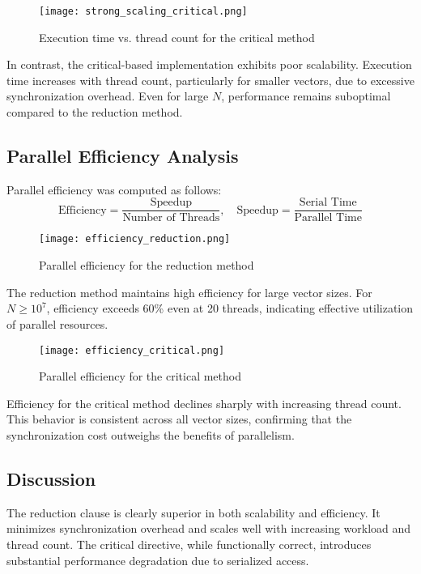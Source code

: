 \documentclass[unicode,11pt,a4paper,oneside,numbers=endperiod,openany]{scrartcl}
\begin{document}
\begin{figure}[h]
  \centering
  \texttt{[image: strong\_scaling\_critical.png]}
  \caption{Execution time vs. thread count for the critical method}
\end{figure}

In contrast, the critical-based implementation exhibits poor scalability. Execution time increases with thread count, particularly for smaller vectors, due to excessive synchronization overhead. Even for large $N$, performance remains suboptimal compared to the reduction method.

\subsection*{Parallel Efficiency Analysis}

Parallel efficiency was computed as follows:
\[
\text{Efficiency} = \frac{\text{Speedup}}{\text{Number of Threads}}, \quad \text{Speedup} = \frac{\text{Serial Time}}{\text{Parallel Time}}
\]

\begin{figure}[h]
  \centering
  \texttt{[image: efficiency\_reduction.png]}
  \caption{Parallel efficiency for the reduction method}
\end{figure}

The reduction method maintains high efficiency for large vector sizes. For $N \geq 10^7$, efficiency exceeds 60\% even at 20 threads, indicating effective utilization of parallel resources.

\begin{figure}[h]
  \centering
  \texttt{[image: efficiency\_critical.png]}
  \caption{Parallel efficiency for the critical method}
\end{figure}

Efficiency for the critical method declines sharply with increasing thread count. This behavior is consistent across all vector sizes, confirming that the synchronization cost outweighs the benefits of parallelism.

\subsection*{Discussion}

The reduction clause is clearly superior in both scalability and efficiency. It minimizes synchronization overhead and scales well with increasing workload and thread count. The critical directive, while functionally correct, introduces substantial performance degradation due to serialized access.
\end{document}
